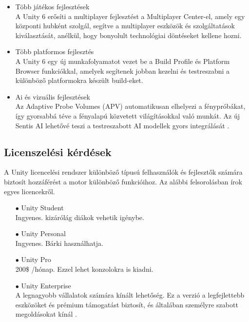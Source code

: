 \documentclass[
]{thesis-ekf}
\theoremstyle{definition}
\theoremstyle{remark}
\begin{document}
\begin{itemize}
\begin{itemize}
		\item Több játékos fejlesztések \\A  Unity 6 erősíti a multiplayer fejlesztést a Multiplayer Center-el, amely egy központi hubként szolgál, segítve a multiplayer eszközök és szolgáltatások kiválasztását, anélkül, hogy bonyolult technológiai döntéseket kellene hozni.
		\item Több platformos fejlesztés \\A Unity 6 egy új munkafolyamatot vezet be a Build Profile és Platform Browser funkciókkal, amelyek segítenek jobban kezelni és testreszabni a különböző platformokra készült build-eket.
		\item Ai és vizuális fejlesztések \\Az Adaptive Probe Volumes (APV) automatikusan elhelyezi a fénypróbákat, így gyorsabbá téve a fényalapú közvetett világításokkal való munkát. Az új Sentis AI lehetővé teszi a testreszabott AI modellek gyors integrálását \cite{Unity6}.
	\end{itemize}
\end{itemize}
\subsection{Licenszelési kérdések}
A Unity licencelési rendszer különböző típusú felhasználók és fejlesztők számára biztosít hozzáférést a motor különböző funkcióihoz. Az alábbi felsorolásban írok egyes licencekről.
\begin{itemize}
	\item[$\bullet$] Unity Student \\ Ingyenes. kizárólág diákok vehetik igénybe.
	\item[$\bullet$] Unity Personal\\ Ingyenes. Bárki használhatja.
	\item[$\bullet$] Unity Pro\\200\$ /hónap. Ezzel lehet konzolokra is kiadni.
	\item[$\bullet$] Unity Enterprise\\A legnagyobb vállalatok számára kínált lehetőség. Ez a verzió a legfejlettebb eszközöket és prémium támogatást biztosít, és általában személyre szabott megoldásokat kínál \cite{UnityLicences}.
\end{itemize}
\end{document}
